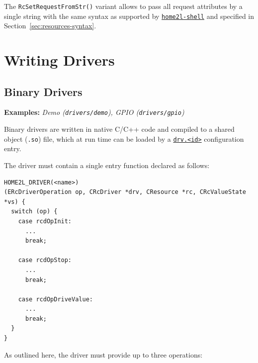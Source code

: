 \documentclass[12pt,english,parskip=half]{scrreprt}
\newcommand{\idx}[1]{#1\index{#1}}
\newcommand{\envref}[1]{\hyperref[env:#1]{\texttt{#1}}}        %
\newcommand{\toolref}[1]{\hyperref[tool:#1]{\texttt{\idx{#1}}}}
\begin{document}
The \texttt{RcSetRequestFromStr()} variant allows to pass all request attributes
by a single string with the same syntax as supported by
\toolref{home2l-shell} and specified in Section~\ref{sec:resources-syntax}.





%
\chapter{Writing Drivers}
\label{ch:drvdev}
%



\section{Binary Drivers}
\label{sec:drvdev-binary}


\textbf{Examples:} \emph{Demo (\texttt{drivers/demo}), GPIO (\texttt{drivers/gpio})}

Binary drivers are written in native C/C++ code and compiled to a shared
object (\texttt{.so}) file, which at run time can be loaded by a \envref{drv.<id>}
configuration entry.

The driver must contain a single entry function declared as follows:

\begin{lstlisting}
HOME2L_DRIVER(<name>)
(ERcDriverOperation op, CRcDriver *drv, CResource *rc, CRcValueState *vs) {
  switch (op) {
    case rcdOpInit:
      ...
      break;

    case rcdOpStop:
      ...
      break;

    case rcdOpDriveValue:
      ...
      break;
  }
}
\end{lstlisting}

As outlined here, the driver must provide up to three operations:
\end{document}
